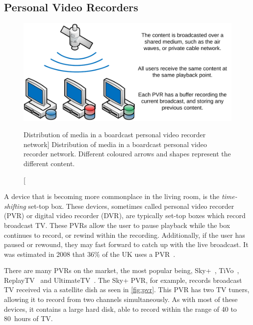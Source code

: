 
\subsection{Personal Video Recorders}
\label{sect:pvr}


\begin{figure}[t]
    \centering

    \includegraphics[width=0.7\columnwidth]{./diagrams/PVR}

    \caption
        [Distribution of media in a boardcast personal video recorder network]
        {Distribution of media in a boardcast personal video recorder network. Different coloured arrows and shapes represent the different content.}
    \label{fig:pvr}
\end{figure}


    A device that is becoming more commonplace in the living room, is the \emph{time-shifting} set-top box. These devices, sometimes called personal video recorder (PVR) or digital video recorder (DVR), are typically set-top boxes which record broadcast TV. These PVRs allow the user to pause playback while the box continues to record, or rewind within the recording. Additionally, if the user has paused or rewound, they may fast forward to catch up with the live broadcast. It was estimated in 2008 that 36\% of the UK uses a PVR~\cite{YouGov2008red}.

    There are many PVRs on the market, the most popular being, Sky+~\cite{sky+}, TiVo~\cite{tivo}, ReplayTV~\cite{replaytv} and UltimateTV~\cite{ultimatetv}. The Sky+ PVR, for example, records broadcast TV received via a satellite dish as seen in \autoref{fig:pvr}. This PVR has two TV tuners, allowing it to record from two channels simultaneously. As with most of these devices, it contains a large hard disk, able to record within the range of 40 to 80~hours of TV.

